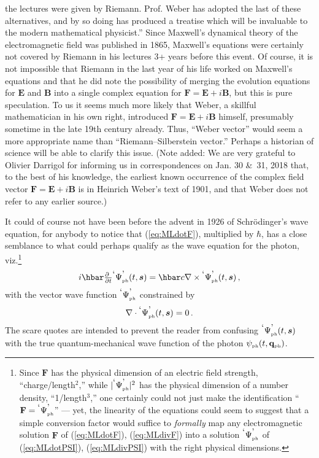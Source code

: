 \documentclass[11pt]{article}
\theoremstyle{definition}
\newcommand{\pddt}{\frac{\partial\phantom{t}}{\partial t}}
\newcommand{\refeq}[1]{(\ref{#1})}
\newcommand{\vect}[1] {\boldsymbol{{ #1}} }
\newcommand{\sV}{{\vect{s}}}            %
\numberwithin{equation}{section}
\newcommand{\bB}{\mathbf{B}}
\newcommand{\bE}{\mathbf{E}}
\newcommand{\bF}{\mathbf{F}}
\newcommand{\bq}{\mathbf{q}}
\newcommand{\psiPH}{{\psi_{\mbox{\rm\tiny ph}}}}
\newcommand{\PsiPh}{{}^{\mbox{\textrm{`}}}{\Psi_{\mbox{\rm\tiny ph}}^{\mbox{\textrm{'}}}}}
\newcommand{\nab}{\nabla}
\begin{document}
{        the lectures were given by Riemann. 
      Prof. Weber has adopted the last of these alternatives, and by so doing has produced a treatise which will be invaluable to the 
        modern mathematical physicist.''
  Since Maxwell's dynamical theory of the electromagnetic field was published in 1865, Maxwell's equations 
    were certainly not covered by Riemann in his lectures 3+ years before this event. 
  Of course, it is not impossible that Riemann in the last year of his life worked on Maxwell's equations and 
    that he did note the possibility of merging the evolution equations 
    for $\bE$ and $\bB$ into a single complex equation for $\bF = \bE +i\bB$,
 but this is pure speculation.
  To us it seems much more likely that Weber, a skillful mathematician in his own right, introduced $\bF = \bE +i\bB$ himself, 
    presumably sometime in the late 19th century already.
  Thus, ``Weber vector'' would seem a more appropriate name than ``Riemann--Silberstein vector.''
  Perhaps a historian of science will be able to clarify this issue.
 (Note added: We are very grateful to Olivier Darrigol for informing us in correspondences on Jan. 30 \&\ 31, 2018 that, 
  to the best of his knowledge, the earliest known occurrence of the complex field vector $\bF = \bE +i\bB$ is in Heinrich Weber's text
 of 1901, and that Weber does not refer to any earlier source.)}

 It could of course not have been before the advent in 1926 of Schr\"odinger's wave equation, for
anybody to notice that (\ref{eq:MLdotF}), multiplied by $\hbar$, has a close semblance
to what could perhaps qualify as the wave equation for the photon, viz.\footnote{Since $\bF$ has the physical dimension 
of an electric field strength, ``charge/length$^2$,'' while $|\PsiPh|^2$ has the physical dimension of a number density, ``1/length$^3$,''
 one certainly could not just make the identification ``$\bF=\PsiPh$'' --- yet, the linearity of the equations could seem to
suggest that a simple conversion factor would suffice to \emph{formally} map any electromagnetic solution
$\bF$ of \refeq{eq:MLdotF}, \refeq{eq:MLdivF} into a solution $\PsiPh$ of \refeq{eq:MLdotPSI}, \refeq{eq:MLdivPSI}
with the right physical dimensions.\vspace{-10pt}}
\begin{equation}
 i \hbar \textstyle{\pddt}{\PsiPh}(t,\sV)
= \label{eq:MLdotPSI}
        \hbar c\nab\times{\PsiPh}(t,\sV) \, ,
\end{equation}
with the vector wave function ${\PsiPh}$ constrained by
\begin{equation}
\textstyle
        \nab\cdot {\PsiPh}(t,\sV)  
= \label{eq:MLdivPSI}
        0\, .
\end{equation}
 The scare quotes are intended to prevent the reader from confusing ${\PsiPh}(t,\sV)$ with the true quantum-mechanical wave function 
of the photon $\psiPH(t,\bq_{\mbox{\tiny{ph}}})$.
\end{document}
